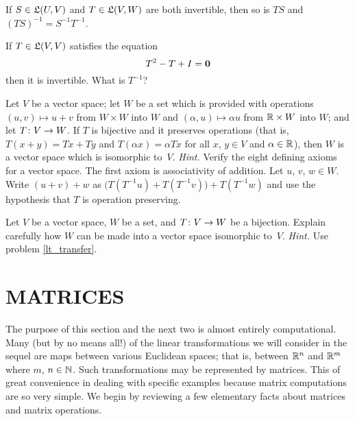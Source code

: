 \begin{prob} If $S \in \mathfrak{L}(U,V)$ and $T \in \mathfrak{L}(V,W)$ are both invertible, then so is
$TS$ and $(TS)^{-1} = S^{-1}T^{-1}$.
\end{prob}

\begin{prob} If $T \in \mathfrak{L}(V,V)$ satisfies the equation
  \[ T^2 - T + I = \mathbf{0} \]
then it is invertible.  What is $T^{-1}$?
\end{prob}

\begin{prob}\label{lt_transfer} Let $V$ be a vector space; let $W$ be a set which is provided
with operations $(u,v) \mapsto u + v$ from $W \times W$ into $W$ and $(\alpha,u) \mapsto
\alpha u$ from $\mathbb{R} \times W$ into $W$; and let $T \colon V \rightarrow W$. If $T$ is bijective and it
preserves operations (that is, $T(x + y) = Tx + Ty$ and $T(\alpha x) = \alpha Tx$ for all $x$,
$y \in V$ and $\alpha \in \mathbb{R}$), then $W$ is a vector space which is isomorphic to~$V$.
\emph{Hint.}  Verify the eight defining axioms for a vector space. The first axiom is
associativity of addition.  Let $u$, $v$, $w \in W$. Write $(u + v) + w$ as $\bigl(T(T^{-1}u)
+ T(T^{-1}v)\bigr) + T(T^{-1}w)$ and use the hypothesis that $T$ is operation preserving.
\end{prob}

\begin{prob}\label{prob_vsp_from_bij}  Let $V$ be a vector space, $W$ be a set, and $T \colon
V \rightarrow W$ be a bijection. Explain carefully how $W$ can be made into a vector space
isomorphic to~$V$. \emph{Hint.} Use problem \ref{lt_transfer}.
\end{prob}











\section{MATRICES}\label{matr}
The purpose of this section and the next two is almost entirely computational.  Many (but by
no means all!) of the linear transformations we will consider in the sequel are maps between
various Euclidean spaces; that is, between $\mathbb{R}^n$ and $\mathbb{R}^m$ where $m$, $n \in \mathbb{N}$.  Such
transformations may be represented by matrices.  This of great convenience in dealing with
specific examples because matrix computations are so very simple. We begin by reviewing a few
elementary facts about matrices and matrix operations.

